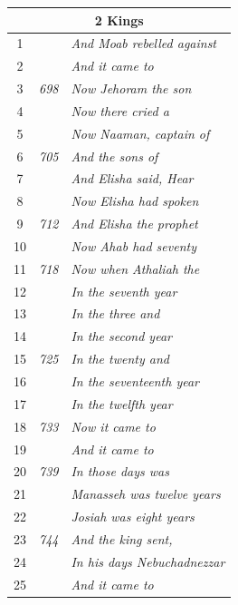 \documentclass{article}
\newlength{\minipageheight}
\newlength{\minipagewidth}
\begin{document}
\begin{minipage}[r][\minipageheight][t]{\minipagewidth}
\begin{longtable}{ccl}
        \multicolumn{3}{c}{\textbf{2 Kings}}                             \\
        \hline
        1           &              & \textit{And Moab rebelled against}  \\
        2           &              & \textit{And it came to}             \\
        3           & \textit{698} & \textit{Now Jehoram the son}        \\
        4           &              & \textit{Now there cried a}          \\
        5           &              & \textit{Now Naaman, captain of}     \\
        6           & \textit{705} & \textit{And the sons of}            \\
        7           &              & \textit{And Elisha said, Hear}      \\
        8           &              & \textit{Now Elisha had spoken}      \\
        9           & \textit{712} & \textit{And Elisha the prophet}     \\
        10          &              & \textit{Now Ahab had seventy}       \\
        11          & \textit{718} & \textit{Now when Athaliah the}      \\
        12          &              & \textit{In the seventh year}        \\
        13          &              & \textit{In the three and}           \\
        14          &              & \textit{In the second year}         \\
        15          & \textit{725} & \textit{In the twenty and}          \\
        16          &              & \textit{In the seventeenth year}    \\
        17          &              & \textit{In the twelfth year}        \\
        18          & \textit{733} & \textit{Now it came to}             \\
        19          &              & \textit{And it came to}             \\
        20          & \textit{739} & \textit{In those days was}          \\
        21          &              & \textit{Manasseh was twelve years}  \\
        22          &              & \textit{Josiah was eight years}     \\
        23          & \textit{744} & \textit{And the king sent,}         \\
        24          &              & \textit{In his days Nebuchadnezzar} \\
        25          &              & \textit{And it came to}             \\
    \end{longtable}


\end{minipage}
\end{document}
